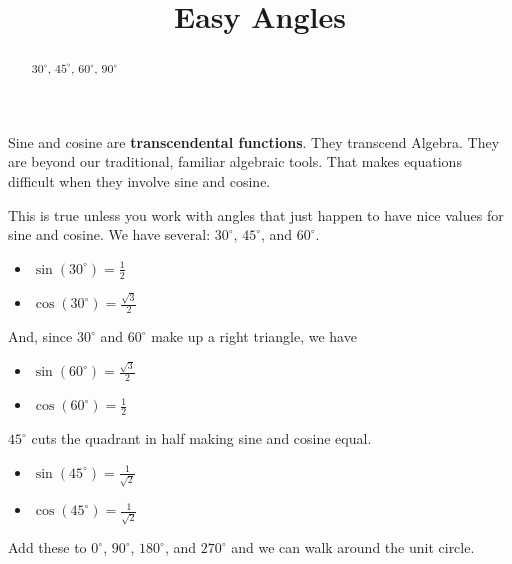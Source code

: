\documentclass{ximera}
\title{Easy Angles}
\begin{document}
\begin{abstract}
$30^{\circ}$, $45^{\circ}$, $60^{\circ}$, $90^{\circ}$
\end{abstract}
\maketitle


Sine and cosine are \textbf{transcendental functions}.  They transcend Algebra. They are beyond our traditional, familiar algebraic tools.  That makes equations difficult when they involve sine and cosine.


This is true unless you work with angles that just happen to have nice values for sine and cosine.  We have several: $30^{\circ}$, $45^{\circ}$, and $60^{\circ}$.




\begin{itemize}
\item $\sin(30^{\circ}) = \frac{1}{2}$
\item $\cos(30^{\circ}) = \frac{\sqrt{3}}{2}$
\end{itemize}


And, since $30^{\circ}$ and $60^{\circ}$ make up a right triangle, we have 


\begin{itemize}
\item $\sin(60^{\circ}) = \frac{\sqrt{3}}{2}$
\item $\cos(60^{\circ}) = \frac{1}{2}$
\end{itemize}




$45^{\circ}$ cuts the quadrant in half making sine and cosine equal.

\begin{itemize}
\item $\sin(45^{\circ}) = \frac{1}{\sqrt{2}}$
\item $\cos(45^{\circ}) = \frac{1}{\sqrt{2}}$
\end{itemize}



Add these to $0^{\circ}$, $90^{\circ}$, $180^{\circ}$, and $270^{\circ}$ and we can walk around the unit circle.
\end{document}
